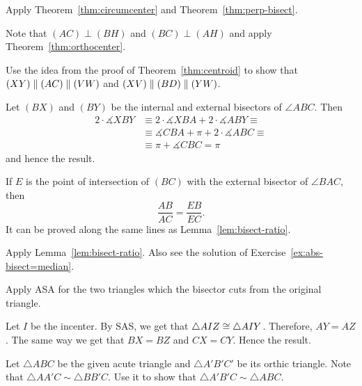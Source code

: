 
\setcounter{eqtn}{0}

Apply Theorem~\ref{thm:circumcenter} and Theorem~\ref{thm:perp-bisect}.

Note that $(AC)\perp (BH)$ and $(BC)\perp (AH)$ and apply Theorem~\ref{thm:orthocenter}.

Use the idea from the proof of Theorem~\ref{thm:centroid}
to show that $(XY)\parallel (AC)\z\parallel (VW)$ and
$(XV)\parallel (BD)\z\parallel (YW)$.

Let $(BX)$ and $(BY)$ be the internal and external bisectors of $\angle ABC$.
Then 
\begin{align*}
2\cdot \measuredangle XBY&\equiv2\cdot \measuredangle XBA+2\cdot \measuredangle ABY\equiv
\\
&\equiv\measuredangle CBA+\pi+2\cdot \measuredangle ABC\equiv
\\
&\equiv \pi+\measuredangle CBC=\pi
\end{align*}
and hence the result.

If $E$ is the point of intersection of $(BC)$ 
with the external bisector of $\angle BAC$, then 
$$\frac{AB}{AC}=\frac{EB}{EC}.$$
It can be proved along the same lines as Lemma~\ref{lem:bisect-ratio}.

Apply Lemma~\ref{lem:bisect-ratio}.
Also see the solution of Exercise~\ref{ex:abs-bisect=median}.

Apply ASA for the two triangles which the bisector cuts from the original triangle. 

Let $I$ be the incenter.
By SAS, we get that $\triangle AIZ\z\cong\triangle AIY$.
Therefore, $AY=AZ$.
The same way we get that $BX=BZ$ and $CX=CY$.
Hence the result.

Let $\triangle ABC$ be the given acute triangle and $\triangle A'B'C'$ 
be its orthic triangle.
Note that $\triangle AA'C\sim\triangle BB'C$.
Use it to show that $\triangle A'B'C\sim \triangle ABC$.

